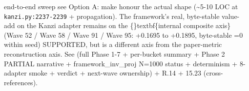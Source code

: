 \documentclass{article}
\begin{document}
end-to-end sweep  see  Option A: make  honour the actual  shape (\textasciitilde{}5-10 LOC at \texttt{kanzi.py:2237-2239} +  propagation). The framework's real, byte-stable value-add on the Kanzi adapter remains on the \{\}textbf\{internal composite axis\} (Wave 52 / Wave 58 / Wave 91 / Wave 95: +0.1695 to +0.1895, byte-stable =0 within seed)  SUPPORTED, but is a different axis from the paper-metric reconstruction axis. See  (full Phase 1-7 + per-bucket summary + Phase 2 PARTIAL narrative + framework\_inv\_proj N=1000 status + determinism + 8-adapter smoke + verdict + next-wave ownership) +  R.14 +  15.23 (cross-references).
\end{document}
